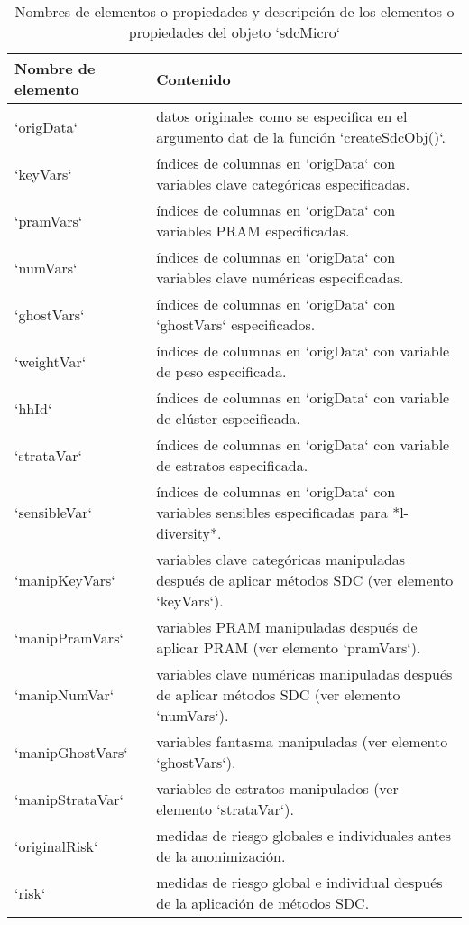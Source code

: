 \documentclass[
]{book}
\theoremstyle{definition}
\theoremstyle{definition}
\theoremstyle{definition}
\theoremstyle{definition}
\theoremstyle{remark}
\begin{document}
\begin{table}

\caption{\label{tab:tabMicro2}Nombres de elementos o propiedades y descripción de los elementos o propiedades del objeto `sdcMicro`}
\centering
\begin{tabular}[t]{l|l}
\hline
Nombre de elemento & Contenido\\
\hline
`origData` & datos originales como se especifica en el argumento dat de la función `createSdcObj()`.\\
\hline
`keyVars` & índices de columnas en `origData` con variables clave categóricas especificadas.\\
\hline
`pramVars` & índices de columnas en `origData` con variables PRAM especificadas.\\
\hline
`numVars` & índices de columnas en `origData` con variables clave numéricas especificadas.\\
\hline
`ghostVars` & índices de columnas en `origData` con `ghostVars` especificados.\\
\hline
`weightVar` & índices de columnas en `origData` con variable de peso especificada.\\
\hline
`hhId` & índices de columnas en `origData` con variable de clúster especificada.\\
\hline
`strataVar` & índices de columnas en `origData` con variable de estratos especificada.\\
\hline
`sensibleVar` & índices de columnas en `origData` con variables sensibles especificadas para *l-diversity*.\\
\hline
`manipKeyVars` & variables clave categóricas manipuladas después de aplicar métodos SDC (ver elemento `keyVars`).\\
\hline
`manipPramVars` & variables PRAM manipuladas después de aplicar PRAM (ver elemento `pramVars`).\\
\hline
`manipNumVar` & variables clave numéricas manipuladas después de aplicar métodos SDC (ver elemento `numVars`).\\
\hline
`manipGhostVars` & variables fantasma manipuladas (ver elemento `ghostVars`).\\
\hline
`manipStrataVar` & variables de estratos manipulados (ver elemento `strataVar`).\\
\hline
`originalRisk` & medidas de riesgo globales e individuales antes de la anonimización.\\
\hline
`risk` & medidas de riesgo global e individual después de la aplicación de métodos SDC.\\

\end{tabular}
\end{table}
\end{document}
